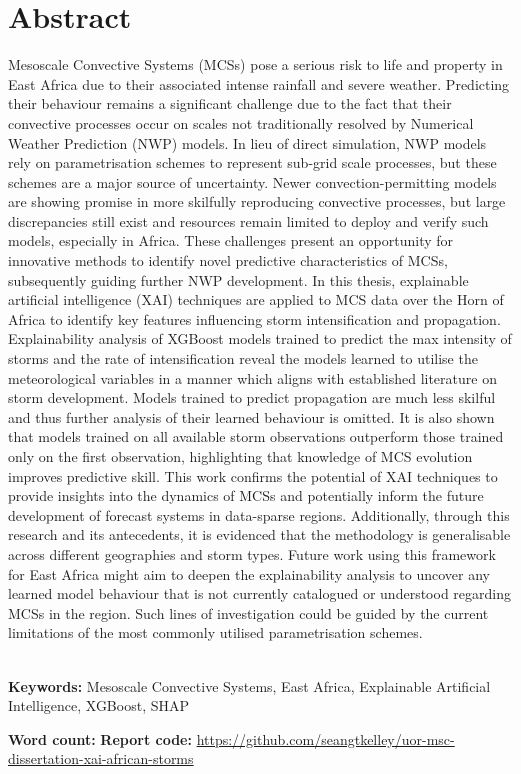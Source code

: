 \chapter*{\center \Large  Abstract}

\noindent
Mesoscale Convective Systems (MCSs) pose a serious risk to life and property in East Africa due to their associated intense rainfall and severe weather. Predicting their behaviour remains a significant challenge due to the fact that their convective processes occur on scales not traditionally resolved by Numerical Weather Prediction (NWP) models. In lieu of direct simulation, NWP models rely on parametrisation schemes to represent sub-grid scale processes, but these schemes are a major source of uncertainty. Newer convection-permitting models are showing promise in more skilfully reproducing convective processes, but large discrepancies still exist and resources remain limited to deploy and verify such models, especially in Africa. These challenges present an opportunity for innovative methods to identify novel predictive characteristics of MCSs, subsequently guiding further NWP development. In this thesis, explainable artificial intelligence (XAI) techniques are applied to MCS data over the Horn of Africa to identify key features influencing storm intensification and propagation. Explainability analysis of XGBoost models trained to predict the max intensity of storms and the rate of intensification reveal the models learned to utilise the meteorological variables in a manner which aligns with established literature on storm development. Models trained to predict propagation are much less skilful and thus further analysis of their learned behaviour is omitted. It is also shown that models trained on all available storm observations outperform those trained only on the first observation, highlighting that knowledge of MCS evolution improves predictive skill. This work confirms the potential of XAI techniques to provide insights into the dynamics of MCSs and potentially inform the future development of forecast systems in data-sparse regions. Additionally, through this research and its antecedents, it is evidenced that the methodology is generalisable across different geographies and storm types. Future work using this framework for East Africa might aim to deepen the explainability analysis to uncover any learned model behaviour that is not currently catalogued or understood regarding MCSs in the region. Such lines of investigation could be guided by the current limitations of the most commonly utilised parametrisation schemes.

~\\[1cm]
\noindent
\textbf{Keywords:} Mesoscale Convective Systems, East Africa, Explainable Artificial Intelligence, XGBoost, SHAP

\vfill
\noindent
\textbf{Word count:}  \newline
\newline
\noindent
\textbf{Report code:} \href{https://github.com/seangtkelley/uor-msc-dissertation-xai-african-storms}{https://github.com/seangtkelley/uor-msc-dissertation-xai-african-storms}  \newline

